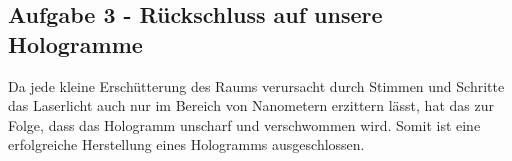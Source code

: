 \subsection*{Aufgabe 3 - Rückschluss auf unsere Hologramme}
Da jede kleine Erschütterung des Raums verursacht durch Stimmen und Schritte das Laserlicht auch nur im Bereich von Nanometern erzittern lässt, hat das zur Folge, dass das Hologramm unscharf und verschwommen wird. Somit ist eine erfolgreiche Herstellung eines Hologramms ausgeschlossen.